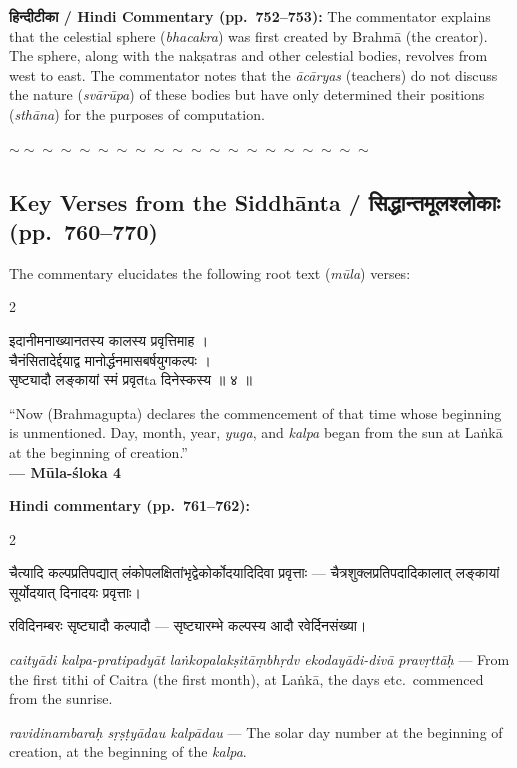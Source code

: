 \documentclass[11pt,a4paper]{article}
\newcommand{\dev}[1]{{\devanagarifont #1}}
\newenvironment{bilingualverse}{%
  \begin{paracol}{2}
  \fontsize{10.5}{13}\selectfont
}{%
  \end{paracol}
  \vspace{0.3cm}
}
\newcommand{\wavydivider}{\begin{center}$\sim\sim\sim\sim\sim\sim\sim\sim\sim\sim\sim\sim\sim\sim\sim\sim\sim\sim\sim\sim$\end{center}}
\begin{document}
\textbf{\dev{हिन्दीटीका} / Hindi Commentary (pp.\ 752--753):}
The commentator explains that the celestial sphere (\textit{bhacakra}) was first created by Brahmā (the creator). The sphere, along with the nakṣatras and other celestial bodies, revolves from west to east. The commentator notes that the \textit{ācāryas} (teachers) do not discuss the nature (\textit{svārūpa}) of these bodies but have only determined their positions (\textit{sthāna}) for the purposes of computation.

\wavydivider

\subsection*{Key Verses from the Siddhānta / \dev{सिद्धान्तमूलश्लोकाः} (pp.\ 760--770)}

The commentary elucidates the following root text (\textit{mūla}) verses:

\begin{bilingualverse}
\begin{leftcolumn*}
\dev{इदानीमनाख्यानतस्य कालस्य प्रवृत्तिमाह ।}\\
\dev{चैनंसितादेर्द्दयाद्व मानोर्द्धनमासबर्षयुगकल्पः ।}\\
\dev{सृष्ट्यादौ लङ्कायां स्मं प्रवृतta दिनेस्कस्य ॥ ४ ॥}
\end{leftcolumn*}
\begin{rightcolumn}
``Now (Brahmagupta) declares the commencement of that time whose beginning is unmentioned. Day, month, year, \textit{yuga}, and \textit{kalpa} began from the sun at Laṅkā at the beginning of creation.''\\[0.3cm]
\hfill\textbf{— Mūla-śloka 4}
\end{rightcolumn}
\end{bilingualverse}

\textbf{Hindi commentary (pp.\ 761--762):}

\begin{paracol}{2}
\begin{leftcolumn*}
\dev{चैत्यादि कल्पप्रतिपद्यात् लंकोपलक्षितांभृद्वेकोर्कोदयादिदिवा प्रवृत्ताः} — चैत्रशुक्लप्रतिपदादिकालात् लङ्कायां सूर्योदयात् दिनादयः प्रवृत्ताः।

\dev{रविदिनम्बरः सृष्ट्यादौ कल्पादौ} — सृष्ट्यारम्भे कल्पस्य आदौ रवेर्दिनसंख्या।
\end{leftcolumn*}
\begin{rightcolumn}
\textit{caityādi kalpa-pratipadyāt laṅkopalakṣitāṃbhṛdv ekodayādi-divā pravṛttāḥ} --- From the first tithi of Caitra (the first month), at Laṅkā, the days etc.\ commenced from the sunrise.

\textit{ravidinambaraḥ sṛṣṭyādau kalpādau} --- The solar day number at the beginning of creation, at the beginning of the \textit{kalpa}.
\end{rightcolumn}
\end{paracol}
\end{document}
